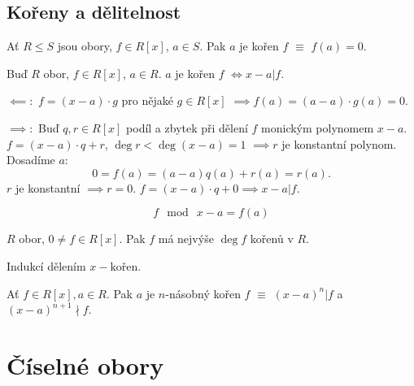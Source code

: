 \documentclass[12pt]{article}                   %
\begin{document}
    \subsection{Kořeny a dělitelnost}
        \begin{definice}
            Ať $R ≤ S$ jsou obory, $f \in R[x]$, $a \in S$. Pak $a$ je kořen $f$ $≡$ $f(a) = 0$.
        \end{definice}

        \begin{tvrzeni}
            Buď $R$ obor, $f \in R[x]$, $a \in R$. $a$ je kořen $f$ $\Leftrightarrow x-a | f$.

            \begin{dukazin}
                $\impliedby :$ $f = (x-a)·g$ pro nějaké $g \in R[x]$ $\implies f(a) = (a - a)·g(a) = 0$.
            
                $\implies:$ Buď $q, r \in R[x]$ podíl a zbytek při dělení $f$ monickým polynomem $x - a$. $f = (x - a)·q + r$, $\deg r < \deg (x - a) = 1$ $\implies r$ je konstantní polynom. Dosadíme $a$:
                $$ 0 = f(a) = (a-a)q(a) + r(a) = r(a). $$ 
                $r$ je konstantní $\implies r = 0$. $f = (x - a)·q + 0 \implies x - a | f$.
            \end{dukazin}
        \end{tvrzeni}

        \begin{pozorovani}
            $$ f \mod\ x-a = f(a) $$ 
        \end{pozorovani}

        \begin{veta}
            $R$ obor, $0 ≠ f \in R[x]$.  Pak $f$ má nejvýše $\deg f$ kořenů v $R$.

            \begin{dukazin}
                Indukcí dělením $x - \text{kořen}$.
            \end{dukazin}
        \end{veta}

        \begin{definice}
            Ať $f \in R[x], a \in R$. Pak $a$ je $n$-násobný kořen $f$ $≡$ $(x - a)^n | f$ a $(x - a)^{n + 1} \nmid f$.
        \end{definice}

\section{Číselné obory}
\end{document}

